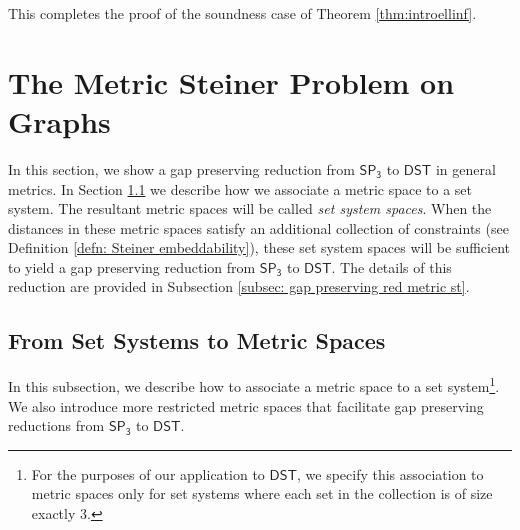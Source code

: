 \documentclass{article}\providecommand{\DeclareRedundantLanguages}[2]{}\usepackage[a4paper,margin=20mm]{geometry}
\newcommand{\1}{\textbf{1}}
\newcommand{\setpT}{$\mathsf{SP_3}$\xspace}
\newcommand{\dst}{$\mathsf{DST}$\xspace}
\begin{document}
This completes the proof of the soundness case of Theorem \ref{thm:introellinf}.


\section{The Metric Steiner Problem on Graphs}\label{sec:metricspace}
In this section, we show a gap preserving reduction from \setpT to \dst in general metrics. In Section \ref{subsec: metric from sets} we describe how we associate a metric space to a set system. The resultant metric spaces will be called \textit{set system spaces}. When the distances in these metric spaces satisfy an additional collection of constraints (see Definition \ref{defn: Steiner embeddability}), these set system spaces will be sufficient to yield a gap preserving reduction from \setpT to \dst. The details of this reduction are provided in Subsection \ref{subsec: gap preserving red metric st}.

\subsection{From Set Systems to Metric Spaces} \label{subsec: metric from sets}
In this subsection, we describe how to associate a  metric space to a set system\footnote{For the purposes of our application to \dst, we specify this association to metric spaces only for  set systems where each set in the collection is of size exactly 3.}. We also introduce more restricted metric spaces that facilitate gap preserving reductions from \setpT to \dst.
\end{document}
